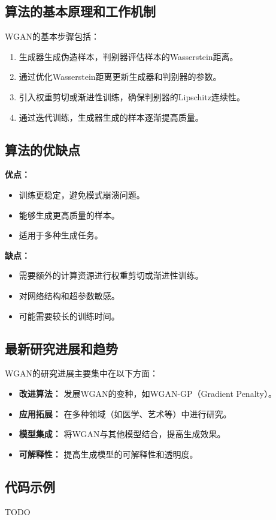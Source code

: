 \subsection*{算法的基本原理和工作机制}
WGAN的基本步骤包括：
\begin{enumerate}
    \item 生成器生成伪造样本，判别器评估样本的Wasserstein距离。
    \item 通过优化Wasserstein距离更新生成器和判别器的参数。
    \item 引入权重剪切或渐进性训练，确保判别器的Lipschitz连续性。
    \item 通过迭代训练，生成器生成的样本逐渐提高质量。
\end{enumerate}

\subsection*{算法的优缺点}
\textbf{优点：}
\begin{itemize}
    \item 训练更稳定，避免模式崩溃问题。
    \item 能够生成更高质量的样本。
    \item 适用于多种生成任务。
\end{itemize}

\textbf{缺点：}
\begin{itemize}
    \item 需要额外的计算资源进行权重剪切或渐进性训练。
    \item 对网络结构和超参数敏感。
    \item 可能需要较长的训练时间。
\end{itemize}

\subsection*{最新研究进展和趋势}
WGAN的研究进展主要集中在以下方面：
\begin{itemize}
    \item \textbf{改进算法：} 发展WGAN的变种，如WGAN-GP（Gradient Penalty）。
    \item \textbf{应用拓展：} 在多种领域（如医学、艺术等）中进行研究。
    \item \textbf{模型集成：} 将WGAN与其他模型结合，提高生成效果。
    \item \textbf{可解释性：} 提高生成模型的可解释性和透明度。
\end{itemize}
\subsection*{代码示例}
TODO
\begin{lstlisting}

\end{lstlisting}


